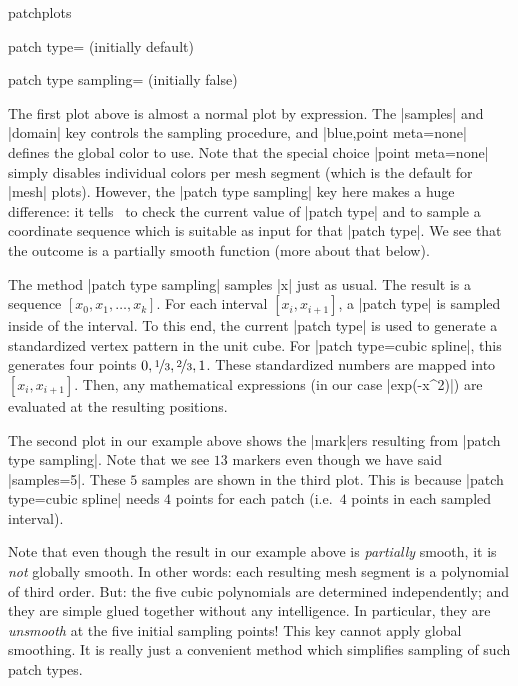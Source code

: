 {\begin{pgfplotslibrary}{patchplots}
\begin{pgfplotskey}{patch type= (initially default)}
\begin{pgfplotskey}{patch type sampling= (initially false)}
\begin{codeexample}[]
\end{codeexample}
	\noindent The first plot above is almost a normal plot by expression. The |samples| and |domain| key controls the sampling procedure, and |blue,point meta=none| defines the global color to use. Note that the special choice |point meta=none| simply disables individual colors per mesh segment (which is the default for |mesh| plots). However, the |patch type sampling| key here makes a huge difference: it tells \PGFPlots\ to check the current value of |patch type| and to sample a coordinate sequence which is suitable as input for that |patch type|. We see that the outcome is a partially smooth function (more about that below).

	The method |patch type sampling| samples |x| just as usual. The result is a sequence $[x_0,x_1,\dotsc,x_k]$. For each interval $[x_i,x_{i+1}]$, a |patch type| is sampled inside of the interval. To this end, the current |patch type| is used to generate a standardized vertex pattern in the unit cube. For |patch type=cubic spline|, this generates four points $0, \nicefrac13, \nicefrac23, 1$. These standardized numbers are mapped into $[x_i, x_{i+1}]$. Then, any mathematical expressions (in our case |exp(-x^2)|) are evaluated at the resulting positions.

	The second plot in our example above shows the |mark|ers resulting from |patch type sampling|. Note that we see $13$ markers even though we have said |samples=5|. These $5$ samples are shown in the third plot. This is because |patch type=cubic spline| needs $4$ points for each patch (i.e.\ $4$ points in each sampled interval).

	Note that even though the result in our example above is \emph{partially} smooth, it is \emph{not} globally smooth. In other words: each resulting mesh segment is a polynomial of third order. But: the five cubic polynomials are determined independently; and they are simple glued together without any intelligence. In particular, they are \emph{unsmooth} at the five initial sampling points! This key cannot apply global smoothing. It is really just a convenient method which simplifies sampling of such patch types.


\end{pgfplotskey}
\end{pgfplotskey}
\end{pgfplotslibrary}}

